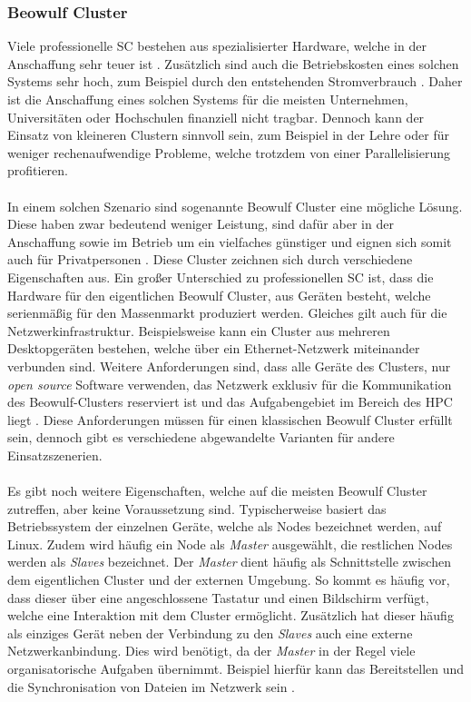 \subsubsection{Beowulf Cluster}
\label{subsubsec:beowulf_cluster}
Viele professionelle \ac{SC} bestehen aus spezialisierter Hardware, welche in der Anschaffung  sehr teuer ist \cite{brown2004engineering}. Zusätzlich sind auch die Betriebskosten eines solchen Systems sehr hoch, zum Beispiel durch den entstehenden Stromverbrauch \cite{nielsen2016introduction}. Daher ist die Anschaffung eines solchen Systems für die meisten Unternehmen, Universitäten oder Hochschulen finanziell nicht tragbar. Dennoch kann der Einsatz von kleineren Clustern sinnvoll sein, zum Beispiel in der Lehre oder für weniger rechenaufwendige Probleme, welche trotzdem von einer Parallelisierung profitieren. 
\\\\
In einem solchen Szenario sind sogenannte Beowulf Cluster eine mögliche Lösung. Diese haben zwar bedeutend weniger Leistung, sind dafür aber in der Anschaffung sowie im Betrieb um ein vielfaches günstiger und eignen sich somit auch für Privatpersonen \cite{adams2008microwulf}. Diese Cluster zeichnen sich durch verschiedene Eigenschaften aus. Ein großer Unterschied zu professionellen \ac{SC} ist, dass die Hardware für den eigentlichen Beowulf Cluster, aus Geräten besteht, welche serienmäßig für den Massenmarkt produziert werden. Gleiches gilt auch für die Netzwerkinfrastruktur. Beispielsweise kann ein Cluster aus mehreren Desktopgeräten bestehen, welche über ein Ethernet-Netzwerk miteinander verbunden sind. Weitere Anforderungen sind, dass alle Geräte des Clusters, nur \emph{open source} Software verwenden, das Netzwerk exklusiv für die Kommunikation des Beowulf-Clusters reserviert ist und das Aufgabengebiet im Bereich des \ac{HPC} liegt \cite{brown2004engineering}. Diese Anforderungen müssen für einen klassischen Beowulf Cluster erfüllt sein, dennoch gibt es verschiedene abgewandelte Varianten für andere Einsatzszenerien.
\\\\
Es gibt noch weitere Eigenschaften, welche auf die meisten Beowulf Cluster zutreffen, aber keine Voraussetzung sind. Typischerweise basiert das Betriebssystem der einzelnen Geräte, welche als Nodes bezeichnet werden, auf Linux. Zudem wird häufig ein Node als \emph{Master} ausgewählt,  die restlichen Nodes werden als \emph{Slaves} bezeichnet. Der \emph{Master} dient häufig als Schnittstelle zwischen dem eigentlichen Cluster und der externen Umgebung. So kommt es häufig vor, dass dieser über eine angeschlossene Tastatur und einen Bildschirm verfügt, welche eine Interaktion mit dem Cluster ermöglicht. Zusätzlich hat dieser häufig als einziges Gerät neben der Verbindung zu den \emph{Slaves} auch eine externe Netzwerkanbindung. Dies wird benötigt, da der \emph{Master} in der Regel viele organisatorische Aufgaben übernimmt. Beispiel hierfür kann das Bereitstellen und die Synchronisation von Dateien im Netzwerk sein \cite{brown2004engineering}.
